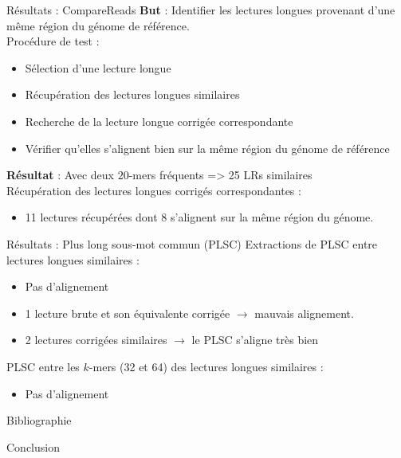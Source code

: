 \documentclass[11pt]{beamer}
\begin{document}
\begin{frame}[fragile]{Résultats : CompareReads}
  \textbf{But} : Identifier les lectures longues provenant d'une même région du génome de référence.\medskip\pause\\
  Procédure de test :\pause
  \begin{itemize}[<+-| alert@+>]
    \item Sélection d'une lecture longue
    \item Récupération des lectures longues similaires
    \item Recherche de la lecture longue corrigée correspondante
    \item Vérifier qu'elles s'alignent bien sur la même région du génome de référence
  \end{itemize}\pause
  \textbf{Résultat} : Avec deux $20$-mers fréquents => 25 LRs similaires\medskip\pause\\
  Récupération des lectures longues corrigés correspondantes :\\
  \begin{itemize}
    \item 11 lectures récupérées dont 8 s'alignent sur la même région du génome.
  \end{itemize}
\end{frame}
\begin{frame}[fragile]{Résultats : Plus long sous-mot commun (PLSC)}
  Extractions de PLSC entre lectures longues similaires :\pause
  \begin{itemize}[<+-| alert@+>]
    \item Pas d'alignement
    \item 1 lecture brute et son équivalente corrigée $\rightarrow$ mauvais alignement.
    \item 2 lectures corrigées similaires $\rightarrow$ le PLSC s'aligne très bien
  \end{itemize}\pause
  PLSC entre les $k$-mers (32 et 64) des lectures longues similaires :\\
  \begin{itemize}
    \item Pas d'alignement
  \end{itemize}
\end{frame}

\begin{frame}[fragile]{Bibliographie}
  
  
\end{frame}

\begin{frame}[standout]
  Conclusion
\end{frame}
\end{document}
